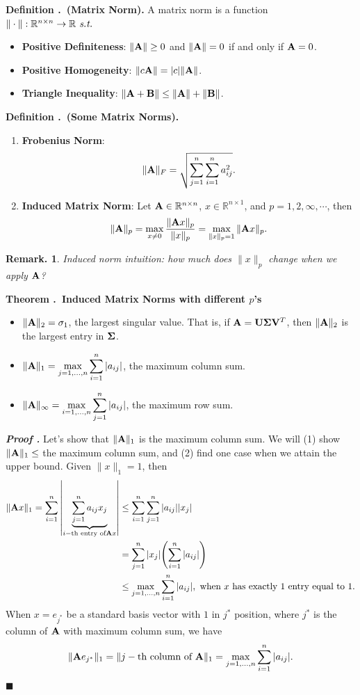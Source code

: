 \documentclass[12pt, a4paper]{article}
\newcounter{index}[subsection]
\newenvironment*{df}[1]{\par\noindent\textbf{Definition \thesubsection.\stepcounter{index}\theindex\ (#1).}}{\par}
\newenvironment*{thm}[1]{\begin{tcolorbox}\par\noindent\textbf{Theorem \thesubsection.\stepcounter{index}\theindex\ #1} \par}{\par\end{tcolorbox}}
\newcounter{nprf}[subsection]
\newenvironment*{prf}{\par\indent\textbf{\textit{Proof \stepcounter{nprf}\thenprf.}}}{\hfill$\blacksquare$\par}
\newtheorem{rmk}{Remark.}[section]
\def\R{{\mathbb{R}}}
\def\A{\vb A}
\def\dsst{\displaystyle}
\def\st{\emph{\ s.t.\ }}
\begin{document}
\begin{df}{Matrix Norm}
	A matrix norm is a function $\|\cdot\|:\R^{n\times n}\to\R\st$
	\begin{itemize}
		\item \textbf{Positive Definiteness}: $\|\A\|\geq0$ and $\|\A\|=0$ if and only if $\A=0$.
		\item \textbf{Positive Homogeneity}: $\|c\A\|=\qty|c|\|\A\|$.
		\item \textbf{Triangle Inequality}: $\|\A+\vb{B}\|\leq\|\A\|+\|\vb{B}\|$.
	\end{itemize}	
\end{df}
\begin{df}{Some Matrix Norms}
	\begin{enumerate}
		\item \textbf{Frobenius Norm}: \[\|\A\|_F=\sqrt{\sum_{j=1}^n\sum_{i=1}^na_{ij}^2}.\]
		\item \textbf{Induced Matrix Norm}: Let $\A\in\R^{n\times n}$, $x\in\R^{n\times1}$, and $p=1,2,\infty,\cdots$, then \[\|\A\|_p=\max_{x\neq0}\dfrac{\|\A x\|_p}{\|x\|_p}=\max_{\|x\|_p=1}\|\A x\|_p.\]
	\end{enumerate}	
\end{df}
\begin{rmk}Induced norm intuition: how much does $\|x\|_p$ change when we apply $\A$?\end{rmk}
\begin{thm}{Induced Matrix Norms with different $p$'s}
	\begin{itemize}
		\item $\|\A\|_2=\sigma_1$, the largest singular value. That is, if $\A=\vb U\vb\Sigma\vb V^T$, then $\|\A\|_2$ is the largest entry in $\vb\Sigma$.
		\item $\dsst\|\A\|_1=\max_{j=1,\dots,n}\sum_{i=1}^n\qty|a_{ij}|$, the maximum column sum.
		\item $\dsst\|\A\|_\infty=\max_{i=1,\dots,n}\sum_{j=1}^n\qty|a_{ij}|$, the maximum row sum. 
	\end{itemize}	
\end{thm}
\begin{prf}
	Let's show that $\|\A\|_1$ is the maximum column sum. We will (1) show $\|\A\|_1\leq$ the maximum column sum, and (2) find one case when we attain the upper bound. Given $\|x\|_1=1$, then \begin{align*}\|\A x\|_1=\sum_{i=1}^n\qty|\underbrace{\sum_{j=1}^n a_{ij}x_{j}}_{i-\text{th entry of}\A x}|&\leq\sum_{i=1}^n\sum_{j=1}^n\qty|a_{ij}|\qty|x_j|\\&=\sum_{j=1}^n\qty|x_j|\qty(\sum_{i=1}^n\qty|a_{ij}|)\\&\leq\max_{j=1,\dots,n}\sum_{i=1}^n\qty|a_{ij}|,\text{ when }x\text{ has exactly 1}\text{ entry equal to }1.\end{align*} When $x=e_{j^*}$ be a standard basis vector with $1$ in $j^*$ position, where $j^*$ is the column of $\A$ with maximum column sum, we have \[\|\A e_{j^*}\|_1=\|j-\text{th column of }\A\|_1=\max_{j=1,\dots,n}\sum_{i=1}^n\qty|a_{ij}|.\]	
\end{prf}
\end{document}
